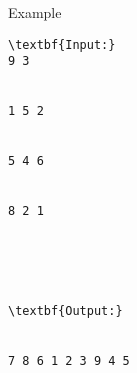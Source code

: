 Example
\begin{verbatim}
\textbf{Input:}
9 3


1 5 2


5 4 6


8 2 1





\textbf{Output:}


7 8 6 1 2 3 9 4 5 \end{verbatim}